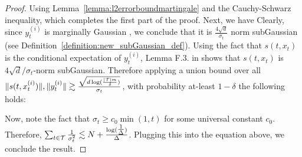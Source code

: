 \begin{proof}



    Using Lemma~\ref{lemma:l2errorboundmartingale} and the Cauchy-Schwarz inequality, 
    which completes the first part of the proof. Next, we have
    Clearly, since $y_t^{(i)}$ is marginally Gaussian , we conclude that it is $\frac{4\sqrt{d}}{\sigma_t}$ norm subGaussian (see Definition~\ref{definition:new_subGaussian_def}). Using the fact that $s(t,x_t)$ is the conditional expectation of $y_t^{(i)}$, Lemma F.3. in \cite{gupta2023sample} shows that $s(t,x_t)$ is $4\sqrt{d}/\sigma_{t}$-norm subGaussian. Therefore applying a union bound over all $\|s(t,x_t^{(i)})\|,\|y_t^{(i)}\| \gtrsim \frac{\sqrt{d\log(\frac{|\mathcal{T}|m}{\delta})}}{\sigma_t}$, with probability at-least $1-\delta$ the following holds:

Now, note the fact that $\sigma_t \geq c_0\min(1,t)$ for some universal constant $c_0$. Therefore, $\sum_{t\in \mathcal{T}} \frac{1}{\sigma_t^2} \lesssim N + \frac{\log(\tfrac{1}{\Delta})}{\Delta}$. Plugging this into the equation above, we conclude the result. 


\end{proof}
